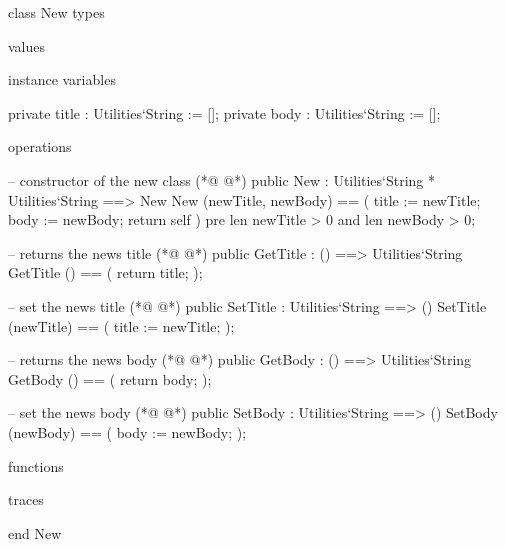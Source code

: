 \begin{vdmpp}[breaklines=true]
class New
types

values

instance variables

 private title : Utilities`String := [];
 private body : Utilities`String := [];
 
operations

 -- constructor of the new class 
(*@
\label{New:14}
@*)
 public New : Utilities`String * Utilities`String ==> New
  New (newTitle, newBody) == (
   title := newTitle;
   body := newBody;
    return self
   )
   pre len newTitle > 0 and len newBody > 0;

 -- returns the news title
(*@
\label{GetTitle:23}
@*)
 public GetTitle : () ==> Utilities`String
  GetTitle () == (
   return title;
   ); 
   
 -- set the news title
(*@
\label{SetTitle:29}
@*)
 public SetTitle : Utilities`String ==> ()
  SetTitle (newTitle) == (
   title := newTitle;
   ); 
   
 -- returns the news body
(*@
\label{GetBody:35}
@*)
 public GetBody : () ==> Utilities`String
  GetBody () == (
   return body;
   ); 
   
 -- set the news body
(*@
\label{SetBody:41}
@*)
 public SetBody : Utilities`String ==> ()
  SetBody (newBody) == (
   body := newBody;
   );   

functions

traces

end New
\end{vdmpp}
